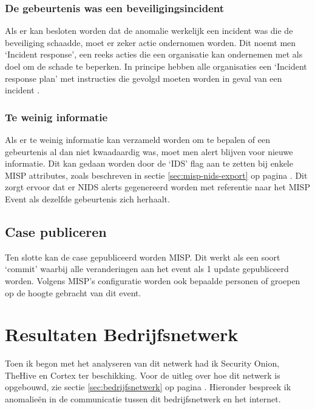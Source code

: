 \documentclass[a4paper, 12pt]{report}
\begin{document}
\subsubsection{De gebeurtenis was een beveiligingsincident}
Als er kan besloten worden dat de anomalie werkelijk een incident was die de beveiliging schaadde, moet er zeker actie ondernomen worden.
Dit noemt men `Incident response', een reeks acties die een organisatie kan ondernemen met als doel om de schade te beperken.
In principe hebben alle organisaties een `Incident response plan' met instructies die gevolgd moeten worden in geval van een incident \autocite{digitalguardian:incident-response}.

\subsubsection{Te weinig informatie}
Als er te weinig informatie kan verzameld worden om te bepalen of een gebeurtenis al dan niet kwaadaardig was, moet men alert blijven voor nieuwe informatie.
Dit kan gedaan worden door de `IDS' flag aan te zetten bij enkele MISP attributes, zoals beschreven in sectie \ref{sec:misp-nids-export} op pagina \pageref{sec:misp-nids-export}.
Dit zorgt ervoor dat er NIDS alerts gegenereerd worden met referentie naar het MISP Event als dezelfde gebeurtenis zich herhaalt.

\subsection{Case publiceren}
Ten slotte kan de case gepubliceerd worden MISP.
Dit werkt als een soort `commit' waarbij alle veranderingen aan het event als 1 update gepubliceerd worden.
Volgens MISP's configuratie worden ook bepaalde personen of groepen op de hoogte gebracht van dit event.


\section{Resultaten Bedrijfsnetwerk}
Toen ik begon met het analyseren van dit netwerk had ik Security Onion, TheHive en Cortex ter beschikking.
Voor de uitleg over hoe dit netwerk is opgebouwd, zie sectie \ref{sec:bedrijfsnetwerk} op pagina \pageref{sec:bedrijfsnetwerk}.
Hieronder bespreek ik anomalieën in de communicatie tussen dit bedrijfsnetwerk en het internet.
\end{document}
